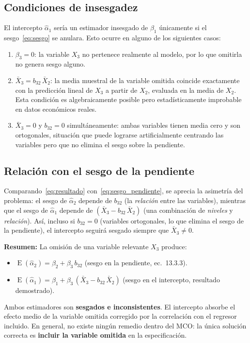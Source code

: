 \documentclass[12pt, letterpaper]{article}
\newcommand{\E}{\operatorname{E}}
\begin{document}
\subsection{Condiciones de insesgadez}

El intercepto $\hat{\alpha}_1$ sería un estimador insesgado de $\beta_1$
únicamente si el sesgo~\eqref{eq:sesgo} se anulara. Esto ocurre en
alguno de los siguientes casos:

\begin{enumerate}[leftmargin=1.8cm, label=\textbf{\arabic*.}]
  \item $\beta_3 = 0$: la variable $X_3$ no pertenece realmente al
    modelo, por lo que omitirla no genera sesgo alguno.
  \item $\bar{X}_3 = b_{32}\,\bar{X}_2$: la media muestral de la
    variable omitida coincide exactamente con la predicción lineal de
    $X_3$ a partir de $X_2$, evaluada en la media de $X_2$. Esta
    condición es algebraicamente posible pero estadísticamente
    improbable en datos económicos reales.
  \item $\bar{X}_3 = 0$ y $b_{32} = 0$ simultáneamente: ambas
    variables tienen media cero y son ortogonales, situación que puede
    lograrse artificialmente centrando las variables pero que no
    elimina el sesgo sobre la pendiente.
\end{enumerate}

\subsection{Relación con el sesgo de la pendiente}

Comparando~\eqref{eq:resultado} con~\eqref{eq:sesgo_pendiente}, se aprecia
la asimetría del problema: el sesgo de $\hat{\alpha}_2$ depende de
$b_{32}$ (la \emph{relación} entre las variables), mientras que el sesgo
de $\hat{\alpha}_1$ depende de $(\bar{X}_3 - b_{32}\,\bar{X}_2)$ (una
combinación de \emph{niveles} y \emph{relación}). Así, incluso si
$b_{32} = 0$ (variables ortogonales, lo que elimina el sesgo de la
pendiente), el intercepto seguirá sesgado siempre que $\bar{X}_3 \neq 0$.

\begin{clave}
  \textbf{Resumen:} La omisión de una variable relevante $X_3$ produce:
  \begin{itemize}[leftmargin=1.2cm]
    \item $\E(\hat{\alpha}_2) = \beta_2 + \beta_3\,b_{32}$ \quad
      (sesgo en la pendiente, ec.\ 13.3.3).
    \item $\E(\hat{\alpha}_1) = \beta_1 + \beta_3\,(\bar{X}_3 - b_{32}\,\bar{X}_2)$
      \quad (sesgo en el intercepto, resultado demostrado).
  \end{itemize}
  Ambos estimadores son \textbf{sesgados e inconsistentes}. El
  intercepto absorbe el efecto medio de la variable omitida corregido por
  la correlación con el regresor incluido. En general, no existe
  ningún remedio dentro del MCO: la única solución correcta es
  \textbf{incluir la variable omitida} en la especificación.
\end{clave}
\end{document}
